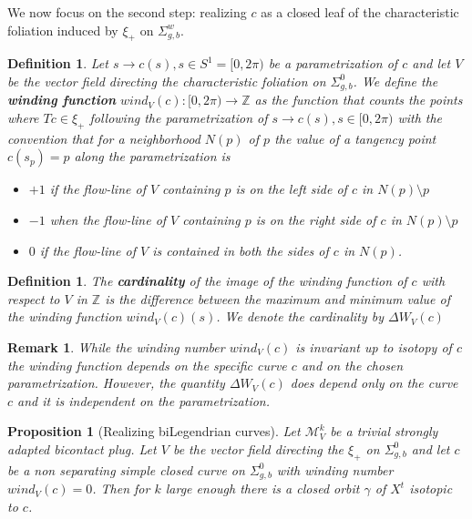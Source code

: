 \documentclass{amsart}
\renewcommand{\emph}{\textbf}
\newtheorem{proposition}[theorem]{Proposition}
\newtheorem{definition}[theorem]{Definition}
\newtheorem{remark}[theorem]{Remark}
\theoremstyle{definition}
\theoremstyle{remark}
\begin{document}
 

We now focus on the second step: realizing $c$ as a closed leaf of the characteristic foliation induced by $\xi_+$ on $\Sigma^w_{g,b}$.




\begin{definition}
 Let $s\rightarrow c(s), s\in S^1=[0,2\pi)$ be a parametrization of $c$ and let $V$ be the vector field directing the characteristic foliation on $\Sigma^0_{g,b}$. We define the \textbf{winding function} $wind_V(c):[0,2\pi)\rightarrow \mathbb{Z}$ as the function that counts the points where $Tc\in \xi_+$ following the parametrization of $s\rightarrow c(s), s\in [0,2\pi)$ with the convention that for a neighborhood $N(p)$ of $p$ the value of a tangency point $c(s_p)=p$ along the parametrization is
 \begin{itemize}
     \item $+1$ if the flow-line of $V$ containing $p$ is on the left side of $c$ in $N(p)\setminus p$
     \item $-1$ when the flow-line of $V$ containing $p$ is on the right side of $c$ in $N(p)\setminus p$ \item $0$ if the flow-line of $V$ is contained in both the sides of $c$ in $N(p)$.
 \end{itemize}
   
\end{definition}

\begin{definition}
    The \emph{cardinality} of the image of the winding function of $c$ with respect to $V$ in $\mathbb{Z}$ is the difference between the maximum and minimum value of the winding function $wind_V(c)(s)$. We denote the cardinality by $\Delta W_V(c)$ 
\end{definition}

\begin{remark}
While the winding number $wind_V(c)$ is invariant up to isotopy of $c$ the winding function depends on the specific curve $c$ and on the chosen parametrization.
However, the quantity $\Delta W_V(c)$ does depend only on the curve $c$ and it is independent on the parametrization. 
\end{remark}
   



\begin{proposition}[Realizing biLegendrian curves]
\label{prop:wind}
      Let $\mathcal{M}_V^k$ be a trivial strongly adapted bicontact plug. Let $V$ be the vector field directing the  $\xi_+$ on $\Sigma^0_{g,b}$ and let $c$ be a non separating simple closed curve on $\Sigma^0_{g,b}$ with winding number $wind_V(c)=0$. Then for $k$ large enough there is a closed orbit $\gamma$ of $X^t$ isotopic to $c$.
    \end{proposition}
\end{document}

